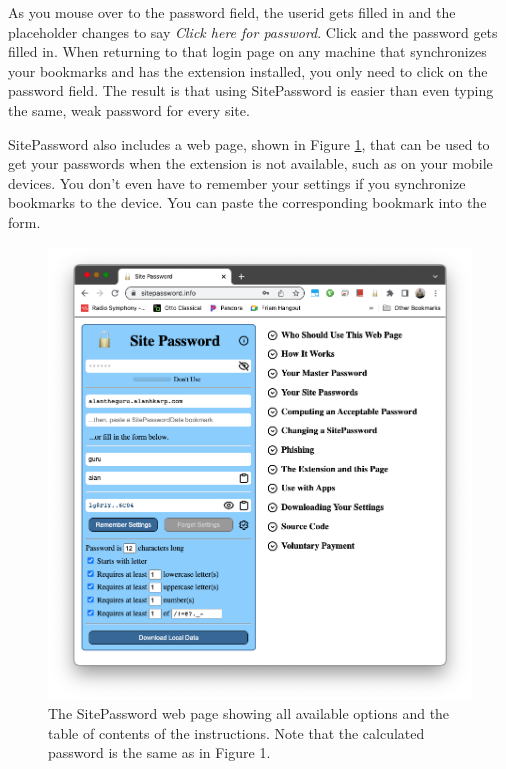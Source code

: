 As you  mouse over to the password field, the userid gets filled in and the placeholder
changes to say {\em Click here for password}.  Click and the password gets
filled in.  When returning to that login page on any machine that synchronizes
your bookmarks and has the extension installed, you only need to click on the 
password field.  The result is that using SitePassword is easier than even typing
the same, weak password for every site.

SitePassword also includes a web page, shown in Figure \ref{fig:webpage}, that can be used to 
get your passwords when the extension is not available, such as on your mobile 
devices.  You don't even have to remember your settings if you synchronize
bookmarks to the device.  You can paste the corresponding bookmark into the form.

\begin{figure}
\begin{center}
  \includegraphics[scale=0.20]{soupsfig2.png}
\end{center}
\caption{\label{fig:webpage} The SitePassword web page showing all available
options and the table of contents of the instructions.  Note that the calculated
password is the same as in Figure 1. }
\end{figure}


